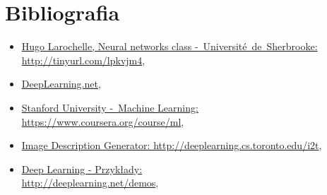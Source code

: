 \chapter{Bibliografia}
\begin{itemize}
  \item \href{https://www.youtube.com/playlist?list=PL6Xpj9I5qXYEcOhn7TqghAJ6NAPrNmUBH}{Hugo Larochelle,
  Neural networks class -~Université~de~Sherbrooke:
  http://tinyurl.com/lpkvjm4},
  \item \href{http://deeplearning.net/tutorial/}{DeepLearning.net},
  \item \href{https://www.coursera.org/course/ml}{Stanford University -~Machine Learning:\\
  https://www.coursera.org/course/ml},
  \item \href{http://deeplearning.cs.toronto.edu/i2t}{Image Description Generator: http://deeplearning.cs.toronto.edu/i2t},
  \item \href{http://deeplearning.net/demos/}{Deep Learning - Przykłady: \\
  http://deeplearning.net/demos},
\end{itemize}